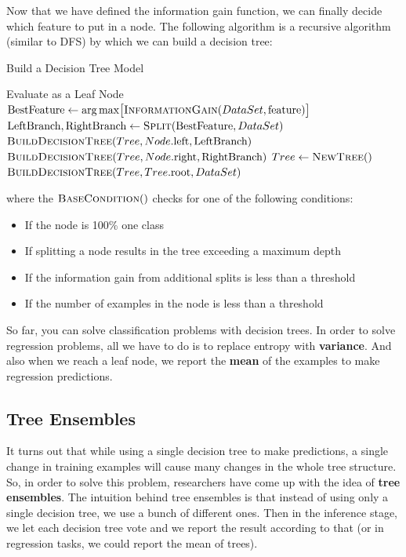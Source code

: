 \documentclass[a4paper, 12pt]{book}
\begin{document}
Now that we have defined the information gain function, we can finally decide which feature to put in a node. The following algorithm is a recursive algorithm (similar to DFS) by which we can build a decision tree:

\begin{algorithm}
\caption{Build a Decision Tree Model}
\begin{algorithmic} [1]
    \State Evaluate as a Leaf Node
    \State \Return
  \EndIf
  \State $\text{BestFeature} \gets \arg \max \bigl[\Call{InformationGain}{DataSet, \text{feature}}\bigr]$
  \State $\text{LeftBranch}, \text{RightBranch} \gets \Call{Split}{\text{BestFeature}, DataSet}$
  \State $\Call{BuildDecisionTree}{Tree, Node.\text{left}, \text{LeftBranch}}$
  \State $\Call{BuildDecisionTree}{Tree, Node.\text{right}, \text{RightBranch}}$
\EndProcedure
\State 
\State $Tree \gets \Call{NewTree}$
\State $\Call{BuildDecisionTree}{Tree, Tree.\text{root}, DataSet}$
\end{algorithmic}
\end{algorithm}

\noindent where the $\Call{BaseCondition}$ checks for one of the following conditions:

\begin{itemize}
    \item If the node is 100\% one class
    \item If splitting a node results in the tree exceeding a maximum depth
    \item If the information gain from additional splits is less than a threshold
    \item If the number of examples in the node is less than a threshold
\end{itemize}

\noindent So far, you can solve classification problems with decision trees. In order to solve regression problems, all we have to do is to replace entropy with \textbf{variance}. And also when we reach a leaf node, we report the \textbf{mean} of the examples to make regression predictions.

\subsection{Tree Ensembles}

It turns out that while using a single decision tree to make predictions, a single change in training examples will cause many changes in the whole tree structure. So, in order to solve this problem, researchers have come up with the idea of \textbf{tree ensembles}. The intuition behind tree ensembles is that instead of using only a single decision tree, we use a bunch of different ones. Then in the inference stage, we let each decision tree vote and we report the result according to that (or in regression tasks, we could report the mean of trees).
\end{document}
